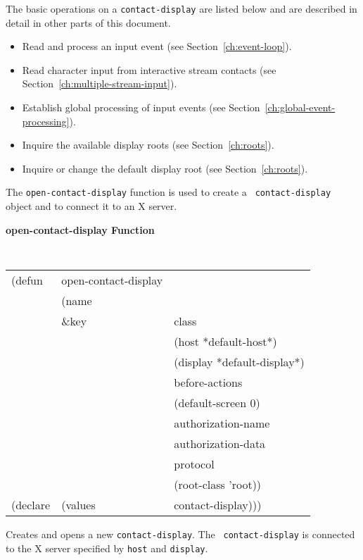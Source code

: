 \documentclass[twoside]{book}
\begin{document}
\begin{sloppy}
The basic operations on a {\tt contact-display} are listed below and are
described in detail in other
parts of this document. 
\begin{itemize}
\item Read and process an input event (see Section~\ref{ch:event-loop}).
\item Read character input from interactive stream contacts (see
Section~\ref{ch:multiple-stream-input}).
\item Establish global processing of input events (see
Section~\ref{ch:global-event-processing}).
\item Inquire the available display roots (see Section~\ref{ch:roots}).
\item Inquire or change the default display root (see
Section~\ref{ch:roots}). 
\end{itemize}

The {\tt open-contact-display} function is used to create a {\tt
contact-display} object and to connect it to an X server.

{\large {\bf open-contact-display \hfill Function}} 
\begin{flushright} \parbox[t]{6.125in}{
\tt
\begin{tabular}{lll}
\raggedright
(defun & open-contact-display & \\ 
& (name \\
& \&key &  class\\
& &  (host *default-host*)\\
& &  (display *default-display*)\\
& &  before-actions\\
& &  (default-screen 0)\\
& &  authorization-name\\
& &  authorization-data\\
& &  protocol\\
& &  (root-class 'root))\\
(declare &(values  & contact-display)))
\end{tabular}
\rm
}\end{flushright}

\begin{flushright} \parbox[t]{6.125in}{
Creates and opens a new {\tt contact-display}. 
The {\tt
contact-display} is connected
to the X server
specified by {\tt host} and {\tt display}. 

}\end{flushright}



\end{sloppy}
\end{document}
